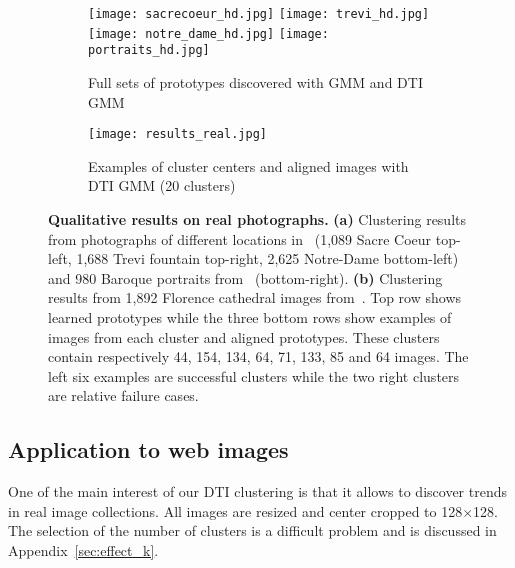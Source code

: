 \documentclass{article}
\begin{document}
\begin{figure}
    \centering
    \begin{subfigure}{\columnwidth}
      \centering
      \texttt{[image: sacrecoeur\_hd.jpg]}\enspace\thinspace\thinspace
      \texttt{[image: trevi\_hd.jpg]}\\
      \vspace{0.2em}
      \texttt{[image: notre\_dame\_hd.jpg]}\enspace\thinspace\thinspace
      \texttt{[image: portraits\_hd.jpg]}
      \caption{Full sets of prototypes discovered with GMM and DTI GMM}
    \end{subfigure}
    \begin{subfigure}{\columnwidth}
      \centering
      \vspace{0.1em}
      \texttt{[image: results\_real.jpg]}
      \caption{Examples of cluster centers and aligned images with DTI GMM (20 clusters)}
    \label{fig:flo}
    \end{subfigure}
      \caption{\textbf{Qualitative results on real photographs.} \textbf{(a)} Clustering 
        results from photographs of different locations in~\cite{li2018megadepth} (1,089 
        Sacre Coeur top-left, 1,688 Trevi fountain top-right, 2,625 Notre-Dame bottom-left) 
        and 980 Baroque portraits from~\cite{karayev2013recognizing} (bottom-right).  
        \textbf{(b)} Clustering results from 1,892 Florence cathedral images 
        from~\cite{li2018megadepth}.  Top row shows learned prototypes while the three bottom 
        rows show examples of images from each cluster and aligned prototypes. These clusters 
        contain respectively 44, 154, 134, 64, 71, 133, 85 and 64 images.  The left six 
      examples are successful clusters while the two right clusters are relative failure 
    cases.}
    \label{fig:real}
    \vspace{-1em}
\end{figure}

\subsection{Application to web images}
 
One of the main interest of our DTI clustering is that it allows to discover trends in real 
image collections. All images are resized and center cropped to 128$\times$128. The selection 
of the number of clusters is a difficult problem and is discussed in 
Appendix~\ref{sec:effect_k}.
\end{document}
